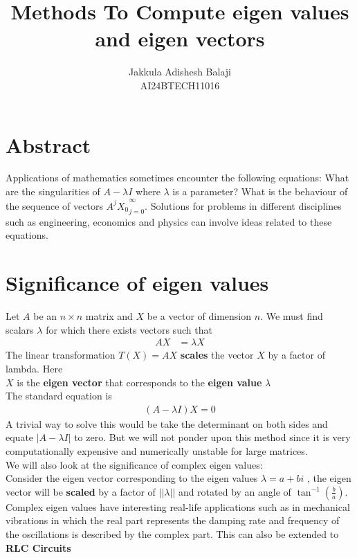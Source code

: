 \documentclass[final]{article}
\title{Methods To Compute eigen values and eigen vectors}
\author{
	Jakkula Adishesh Balaji \\
	AI24BTECH11016 \\ 
	}
\begin{document}
\maketitle
\tableofcontents
\section{Abstract}
Applications of mathematics sometimes encounter the following equations: What are the singularities of $A-\lambda I$ where $\lambda$ is a parameter? What is the behaviour of the sequence of vectors ${{A^j X_0}}_{j = 0} ^ \infty$. Solutions for problems in different disciplines such as engineering, economics and physics can involve ideas related to these equations. \\
\section{Significance of eigen values}
    Let $A$ be an $n \times n$ matrix and $X$ be a vector of dimension $n$. We must find scalars $\lambda$ for which there exists vectors such that 
    \begin{align}
                AX &= \lambda X
    \end{align}
    The linear transformation $T(X) = AX$ \textbf{scales} the vector $X$ by a factor of lambda. Here \\
    $X$ is the \textbf{eigen vector} that corresponds to the \textbf{eigen value} $\lambda$ \\
    The standard equation is
    \begin{align}
            (A - \lambda I)X = 0
    \end{align}
    A trivial way to solve this would be take the determinant on both sides and equate $|A-\lambda I|$ to zero. But we will not ponder upon this method since it is very computationally expensive and numerically unstable for large matrices. \\
    We will also look at the significance of complex eigen values: \\
    Consider the eigen vector corresponding to the eigen values $\lambda = a + bi$ , the eigen vector will be \textbf{scaled} by a factor of $||\lambda||$ and rotated by an angle of $\tan^{-1}\left( \frac{b}{a} \right)$. Complex eigen values have interesting real-life applications such as in mechanical vibrations in which the real part represents the damping rate and frequency of the oscillations is described by the complex part. This can also be extended to \textbf{RLC Circuits}
\end{document}
